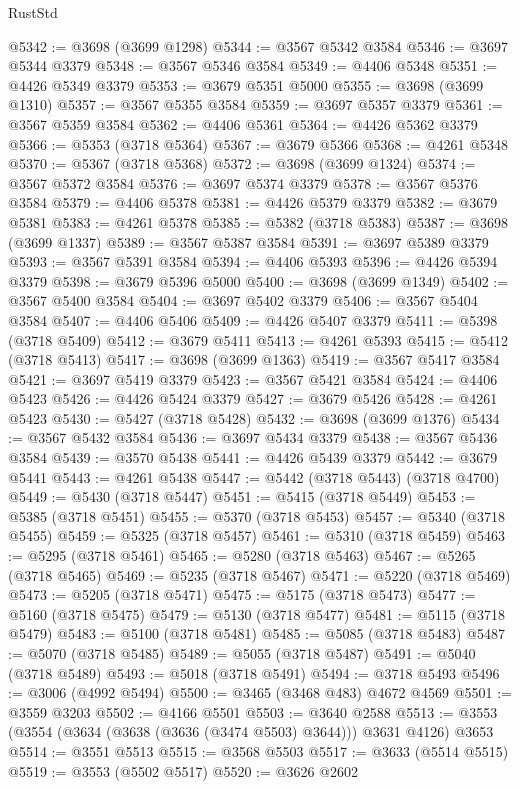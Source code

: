 \begin{lexlean}{RustStd}
\begin{coremodule}
@5342 := @3698 (@3699 @1298)
@5344 := @3567 @5342 @3584
@5346 := @3697 @5344 @3379
@5348 := @3567 @5346 @3584
@5349 := @4406 @5348
@5351 := @4426 @5349 @3379
@5353 := @3679 @5351 @5000
@5355 := @3698 (@3699 @1310)
@5357 := @3567 @5355 @3584
@5359 := @3697 @5357 @3379
@5361 := @3567 @5359 @3584
@5362 := @4406 @5361
@5364 := @4426 @5362 @3379
@5366 := @5353 (@3718 @5364)
@5367 := @3679 @5366
@5368 := @4261 @5348
@5370 := @5367 (@3718 @5368)
@5372 := @3698 (@3699 @1324)
@5374 := @3567 @5372 @3584
@5376 := @3697 @5374 @3379
@5378 := @3567 @5376 @3584
@5379 := @4406 @5378
@5381 := @4426 @5379 @3379
@5382 := @3679 @5381
@5383 := @4261 @5378
@5385 := @5382 (@3718 @5383)
@5387 := @3698 (@3699 @1337)
@5389 := @3567 @5387 @3584
@5391 := @3697 @5389 @3379
@5393 := @3567 @5391 @3584
@5394 := @4406 @5393
@5396 := @4426 @5394 @3379
@5398 := @3679 @5396 @5000
@5400 := @3698 (@3699 @1349)
@5402 := @3567 @5400 @3584
@5404 := @3697 @5402 @3379
@5406 := @3567 @5404 @3584
@5407 := @4406 @5406
@5409 := @4426 @5407 @3379
@5411 := @5398 (@3718 @5409)
@5412 := @3679 @5411
@5413 := @4261 @5393
@5415 := @5412 (@3718 @5413)
@5417 := @3698 (@3699 @1363)
@5419 := @3567 @5417 @3584
@5421 := @3697 @5419 @3379
@5423 := @3567 @5421 @3584
@5424 := @4406 @5423
@5426 := @4426 @5424 @3379
@5427 := @3679 @5426
@5428 := @4261 @5423
@5430 := @5427 (@3718 @5428)
@5432 := @3698 (@3699 @1376)
@5434 := @3567 @5432 @3584
@5436 := @3697 @5434 @3379
@5438 := @3567 @5436 @3584
@5439 := @3570 @5438
@5441 := @4426 @5439 @3379
@5442 := @3679 @5441
@5443 := @4261 @5438
@5447 := @5442 (@3718 @5443) (@3718 @4700)
@5449 := @5430 (@3718 @5447)
@5451 := @5415 (@3718 @5449)
@5453 := @5385 (@3718 @5451)
@5455 := @5370 (@3718 @5453)
@5457 := @5340 (@3718 @5455)
@5459 := @5325 (@3718 @5457)
@5461 := @5310 (@3718 @5459)
@5463 := @5295 (@3718 @5461)
@5465 := @5280 (@3718 @5463)
@5467 := @5265 (@3718 @5465)
@5469 := @5235 (@3718 @5467)
@5471 := @5220 (@3718 @5469)
@5473 := @5205 (@3718 @5471)
@5475 := @5175 (@3718 @5473)
@5477 := @5160 (@3718 @5475)
@5479 := @5130 (@3718 @5477)
@5481 := @5115 (@3718 @5479)
@5483 := @5100 (@3718 @5481)
@5485 := @5085 (@3718 @5483)
@5487 := @5070 (@3718 @5485)
@5489 := @5055 (@3718 @5487)
@5491 := @5040 (@3718 @5489)
@5493 := @5018 (@3718 @5491)
@5494 := @3718 @5493
@5496 := @3006 (@4992 @5494)
@5500 := @3465 (@3468 @483) @4672 @4569
@5501 := @3559 @3203
@5502 := @4166 @5501
@5503 := @3640 @2588
@5513 := @3553 (@3554 (@3634 (@3638 (@3636 (@3474 @5503) @3644))) @3631 @4126) @3653
@5514 := @3551 @5513
@5515 := @3568 @5503
@5517 := @3633 (@5514 @5515)
@5519 := @3553 (@5502 @5517)
@5520 := @3626 @2602

\end{coremodule}
\end{lexlean}
